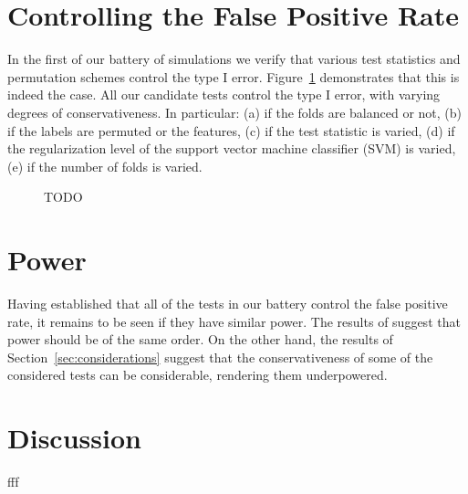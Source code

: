 \documentclass{pnastwo}
\begin{document}
\begin{article}
\section{Controlling the False Positive Rate}
\label{sec:type_i}

In the first of our battery of simulations we verify that various test statistics and permutation schemes control the type I error. 
Figure~\ref{fig:simulation_1} demonstrates that this is indeed the case. 
All our candidate tests control the type I error, with varying degrees of conservativeness. 
In particular:
(a) if the folds are balanced or not,
(b) if the labels are permuted or the features, 
(c) if the test statistic is varied, 
(d) if the regularization level of the support vector machine classifier (SVM) is varied,
(e) if the number of folds is varied.



\begin{figure}[ht]
\centering
\caption{
	\label{fig:simulation_1}
	TODO}
\end{figure}





\section{Power}
\label{sec:power}

Having established that all of the tests in our battery control the false positive rate, it remains to be seen if they have similar power. 
The results of \cite{ramdas_classification_2016} suggest that power should be of the same order. 
On the other hand, the results of Section~\ref{sec:considerations} suggest that the conservativeness of some of the considered tests can be considerable, rendering them underpowered. 





\section{Discussion}
\label{sec:discussion}



fff


















%

\end{article}
\end{document}
